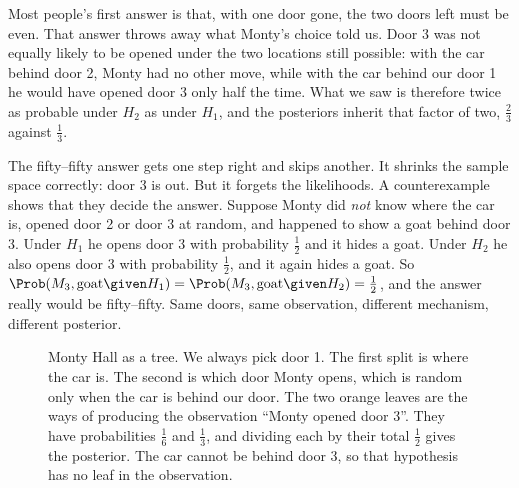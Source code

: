 Most people's first answer is that, with one door gone, the two doors left
must be even. That answer throws away what Monty's choice told us. Door 3 was
not equally likely to be opened under the two locations still possible: with
the car behind door 2, Monty had no other move, while with the car behind our
door 1 he would have opened door 3 only half the time. What we saw is
therefore twice as probable under $H_2$ as under $H_1$, and the posteriors
inherit that factor of two, $\tfrac23$ against $\tfrac13$.

The fifty--fifty answer gets one step right and skips another. It shrinks the
sample space correctly: door 3 is out. But it forgets the likelihoods. A
counterexample shows that they decide the answer. Suppose Monty did \emph{not}
know where the car is, opened door 2 or door 3 at random, and happened to show a
goat behind door 3. Under $H_1$ he opens door 3 with probability $\tfrac12$ and
it hides a goat. Under $H_2$ he also opens door 3 with probability $\tfrac12$,
and it again hides a goat. So
$\Prob(M_3,\text{goat}\given H_1)=\Prob(M_3,\text{goat}\given H_2)=\tfrac12$, and
the answer really would be fifty--fifty. Same doors, same observation, different
mechanism, different posterior.

\begin{figure}[htbp]
\centering
{}
\caption{Monty Hall as a tree. We always pick door 1. The first split is where
the car is. The second is which door Monty opens, which is random only when
the car is behind our door. The two orange leaves are the ways of
producing the observation ``Monty opened door 3''. They have probabilities
$\tfrac16$ and $\tfrac13$, and dividing each by their total $\tfrac12$ gives the posterior.
The car cannot be behind door 3, so that hypothesis has no leaf in the
observation.}
\label{1a:fig:monty-tree}
\end{figure}


